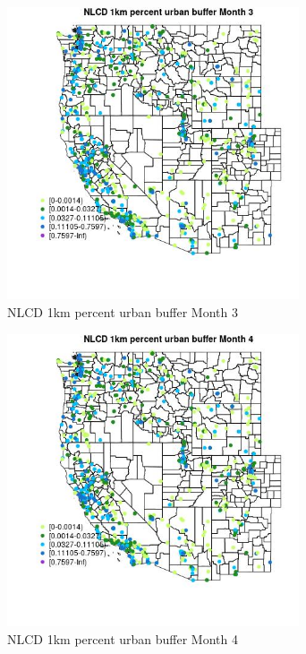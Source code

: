 \begin{figure} 
\centering  
\includegraphics[width=0.77\textwidth]{Code_Outputs/Report_ML_input_PM25_Step4_part_e_de_duplicated_aves_compiled_2019-05-21wNAs_MapObsMo3NLCD_1km_percent_urban_buffer.jpg} 
\caption{\label{fig:Report_ML_input_PM25_Step4_part_e_de_duplicated_aves_compiled_2019-05-21wNAsMapObsMo3NLCD_1km_percent_urban_buffer}NLCD 1km percent urban buffer Month 3} 
\end{figure} 
 

\begin{figure} 
\centering  
\includegraphics[width=0.77\textwidth]{Code_Outputs/Report_ML_input_PM25_Step4_part_e_de_duplicated_aves_compiled_2019-05-21wNAs_MapObsMo4NLCD_1km_percent_urban_buffer.jpg} 
\caption{\label{fig:Report_ML_input_PM25_Step4_part_e_de_duplicated_aves_compiled_2019-05-21wNAsMapObsMo4NLCD_1km_percent_urban_buffer}NLCD 1km percent urban buffer Month 4} 
\end{figure} 
 


